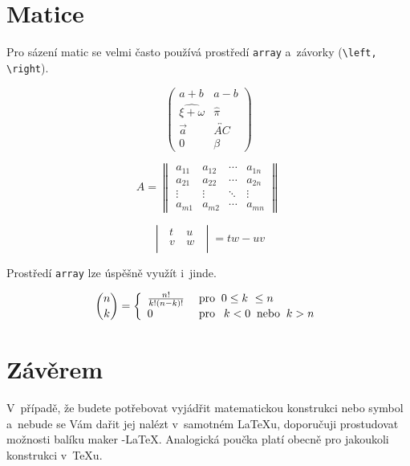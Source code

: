 \documentclass[11pt,a4paper,twocolumn,oneside]{article}
\theoremstyle{definition}
\theoremstyle{plain}
\theoremstyle{plain}
\begin{document}
	\section{Matice}

Pro sázení matic se velmi často používá prostředí \verb|array| a~závorky (\verb|\left, \right|). 

\begin{center}

$$\begin{pmatrix}
  a+b & a-b  \\
  \widehat{\xi+\omega} & \hat{\pi}\\
  \vec{a} &  \overleftrightarrow{AC}\\
  0 & \beta
\end{pmatrix}$$

$$A =
 \begin{Vmatrix}
  a_{11} & a_{12} & \cdots & a_{1n} \\
  a_{21} & a_{22} & \cdots & a_{2n} \\
  \vdots  & \vdots  & \ddots & \vdots  \\
  a_{m1} & a_{m2} & \cdots & a_{mn}
 \end{Vmatrix}$$
 
 $$\begin{vmatrix}
  \;t\ & u~\;\\
  \;v~& w\; \\
 \end{vmatrix} =tw-uv$$
\end{center}

\smallskip
Prostředí \verb|array| lze úspěšně využít i~jinde.	\smallskip

\[  \binom{n}{k} =
\left\{
\begin{array}{ll}
    \frac{n!}{k!(n-k)!} &\; \text{pro $\:0\leq k~\leq n$}\\
    0 & \; \text{pro\: $\:k < 0\:$ nebo $\:k > n$}
  \end{array} \right.\]

	\section{Závěrem}
	
V~případě, že budete potřebovat vyjádřit matematickou konstrukci nebo symbol a~nebude se Vám dařit jej nalézt v~samotném \LaTeX u, doporučuji prostudovat možnosti balíku maker \AmS-\LaTeX.
Analogická poučka platí obecně pro jakoukoli konstrukci v~\TeX u.
\end{document}

